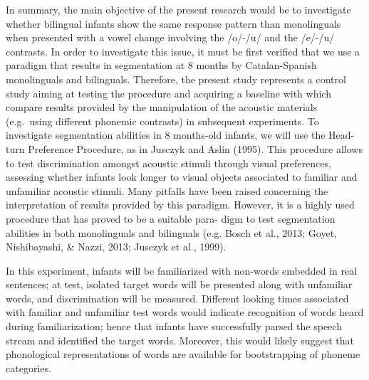 \documentclass[man,floatsintext]{apa6}
\begin{document}
In summary, the main objective of the present research would be to investigate whether bilingual infants show the same response pattern than monolinguals when presented with a vowel change involving the /o/-/u/ and the /e/-/u/ contrasts. In order to investigate this issue, it must be first verified that we use a paradigm that results in segmentation at 8 months by Catalan-Spanish monolinguals and bilinguals. Therefore, the present study represents a control study aiming at testing the procedure and acquiring a baseline with which compare results provided by the manipulation of the acoustic materials (e.g.~using different phonemic contrasts) in subsequent experiments. To investigate segmentation abilities in 8 months-old infants, we will use the Head-turn Preference Procedure, as in Jusczyk and Aslin (1995). This procedure allows to test discrimination amongst acoustic stimuli through visual preferences, assessing whether infants look longer to visual objects associated to familiar and unfamiliar acoustic stimuli. Many pitfalls have been raised concerning the interpretation of results provided by this paradigm. However, it is a highly used procedure that has proved to be a suitable para- digm to test segmentation abilities in both monolinguals and bilinguals (e.g. Bosch et al., 2013; Goyet, Nishibayashi, \& Nazzi, 2013; Jusczyk et al., 1999).

In this experiment, infants will be familiarized with non-words embedded in real sentences; at test, isolated target words will be presented along with unfamiliar words, and discrimination will be measured. Different looking times associated with familiar and unfamiliar test words would indicate recognition of words heard during familiarization; hence that infants have successfully parsed the speech stream and identified the target words. Moreover, this would likely suggest that phonological representations of words are available for bootstrapping of phoneme categories.
\end{document}
